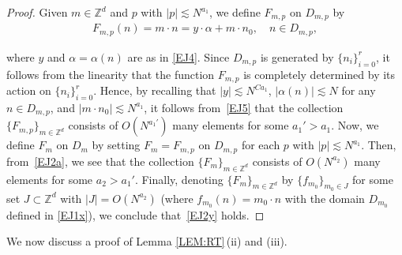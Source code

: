 \documentclass[%
11pt,  reqno]{amsart}
\newcommand{\1}{\hspace{0.2mm}\text{I}\hspace{0.2mm}}
\newcommand{\noi}{\noindent}
\newcommand{\Z}{\mathbb{Z}}
\newcommand{\al}{\alpha}
\newcommand{\les}{\lesssim}
\numberwithin{equation}{section}
\numberwithin{theorem}{section}
\begin{document}
\begin{proof}
Given $m \in \Z^d$
and $p$ with $|p| \les N^{a_1}$, 
we define $F_{m, p}$ on $D_{m, p}$ by 
\begin{align}
 F_{m, p}(n) = m\cdot n = y\cdot \al + m\cdot n_0, \quad n \in D_{m, p}, 
 \label{EJ5}
\end{align}

\noi
where $y$ and $\al = \al(n)$ are as in \eqref{EJ4}.
Since $D_{m, p}$ is generated by 
$\{n_i\}_{i = 0}^r$, 
it follows from the linearity that 
the function 
$F_{m, p}$  is completely
determined by its action
on $\{n_i\}_{i = 0}^r$.
Hence, by recalling that 
$|y| \les N^{Ca_1}$, $|\al(n)|\les N$
for any $n \in D_{m, p}$, 
and 
$|m \cdot n_0| \les N^{a_1}$, 
it follows from~\eqref{EJ5} that 
the collection $\{ F_{m, p}\}_{m \in \Z^d}$
consists of $O(N^{a_1'})$ many elements for some $a_1' > a_1$.
Now, we define $F_m$ on $D_m$ by 
setting $F_m = F_{m, p}$ on $D_{m, p}$
for each  $p$ with $|p| \les N^{a_1}$.
Then, 
from~\eqref{EJ2a}, we see  that 
the collection $\{ F_{m}\}_{m \in \Z^d}$
consists of $O(N^{a_2})$ many elements for some $a_2 > a_1'$.
Finally, denoting $\{ F_{m}\}_{m \in \Z^d}$
by $\{f_{m_0}\}_{m_0 \in J}$ 
for some set $J \subset\Z^d$ with $|J| = O(N^{a_2})$
(where $f_{m_0} (n) = m_0\cdot n$ with the domain  $D_{m_0}$
defined in \eqref{EJ1x}), 
we conclude that~\eqref{EJ2y} holds.
\end{proof}








We now discuss a proof of  Lemma \ref{LEM:RT}\,(ii)
and (iii).
\end{document}
